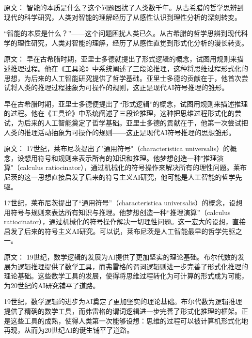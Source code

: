 原文：
智能的本质是什么？这个问题困扰了人类数千年。从古希腊的哲学思辨到现代的科学研究，人类对智能的理解经历了从感性认识到理性分析的深刻转变。

“智能的本质是什么？”——这个问题困扰人类已久。从古希腊的哲学思辨到现代科学的理性研究，人类对智能的理解，经历了从感性直觉到形式化分析的漫长转变。

原文：
早在古希腊时期，亚里士多德就提出了形式逻辑的概念，试图用规则来描述推理过程。他在《工具论》中系统阐述了三段论推理，这种将思维过程形式化的思想，为后来的人工智能研究提供了哲学基础。亚里士多德的贡献在于，他首次尝试将人类的推理过程抽象为可操作的规则，这正是现代AI符号推理的雏形。

早在古希腊时期，亚里士多德便提出了“形式逻辑”的概念，试图用规则来描述推理的过程。他在《工具论》中系统阐述了三段论推理，这种把思维过程形式化的尝试，为后来的人工智能奠定了哲学基础。亚里士多德的贡献在于，他第一次尝试把人类的推理活动抽象为可操作的规则——这正是现代AI符号推理的思想雏形。

原文：
17世纪，莱布尼茨提出了"通用符号"（characteristica universalis）的概念，设想用符号和规则来表示所有的知识和推理。他梦想创造一种"推理演算"（calculus ratiocinator），通过机械化的符号操作来解决所有的理性问题。莱布尼茨的这一思想直接启发了后来的符号主义AI研究，他可能是人工智能的哲学先驱。

17世纪，莱布尼茨提出了“通用符号”（characteristica universalis）的概念，设想用符号与规则来表达所有知识与推理。他梦想创造一种“推理演算”（calculus ratiocinator），通过机械化的符号操作解决一切理性问题。这一宏大的设想，直接启发了后来的符号主义AI研究。可以说，莱布尼茨是人工智能最早的哲学先驱之一。

原文：
19世纪，数学逻辑的发展为AI提供了更加坚实的理论基础。布尔代数的发展为逻辑推理提供了数学工具，而弗雷格的谓词逻辑则进一步完善了形式化推理的理论基础。这些数学工具的发展，使得将思维过程转化为可计算的形式成为可能，为20世纪的AI研究铺平了道路。

19世纪，数学逻辑的进步为AI奠定了更加坚实的理论基础。布尔代数为逻辑推理提供了精确的数学工具，而弗雷格的谓词逻辑进一步完善了形式化推理的框架。正是这些工具的成熟，使得人类第一次能够设想：思维的过程可以被计算机形式化地再现，从而为20世纪AI的诞生铺平了道路。

